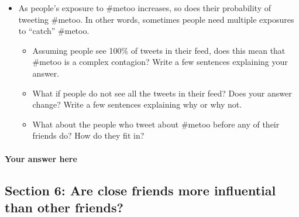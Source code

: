 \documentclass[11pt]{article}
\providecommand{\tightlist}{%
      \setlength{\itemsep}{0pt}\setlength{\parskip}{0pt}}
\begin{document}
\begin{itemize}
\tightlist
\item
  As people's exposure to \#metoo increases, so does their probability
  of tweeting \#metoo. In other words, sometimes people need multiple
  exposures to ``catch'' \#metoo.

  \begin{itemize}
  \tightlist
  \item
    Assuming people see 100\% of tweets in their feed, does this mean
    that \#metoo is a complex contagion? Write a few sentences
    explaining your answer.
  \item
    What if people do not see all the tweets in their feed? Does your
    answer change? Write a few sentences explaining why or why not.
  \item
    What about the people who tweet about \#metoo before any of their
    friends do? How do they fit in?
  \end{itemize}
\end{itemize}

    \hypertarget{your-answer-here}{%
\paragraph{Your answer here}\label{your-answer-here}}

    \hypertarget{section-6-are-close-friends-more-influential-than-other-friends}{%
\subsection{Section 6: Are close friends more influential than other
friends?}\label{section-6-are-close-friends-more-influential-than-other-friends}}
\end{document}
